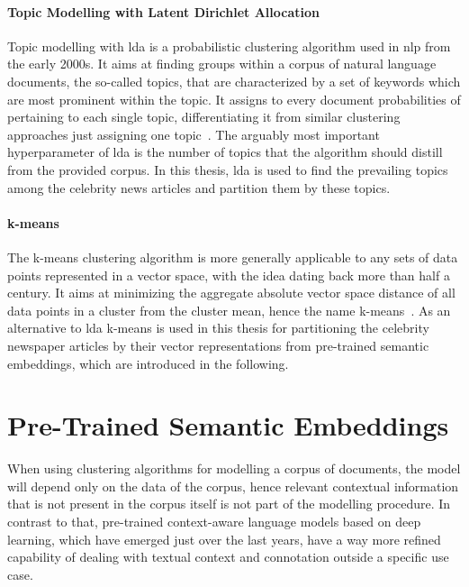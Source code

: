 \paragraph{Topic Modelling with Latent Dirichlet Allocation}\label{ch:lda}
Topic modelling with \gls{lda} is a probabilistic clustering algorithm used in \gls{nlp} from the early 2000s. It aims at finding groups within a corpus of natural language documents, the so-called topics, that are characterized by a set of keywords which are most prominent within the topic. It assigns to every document probabilities of pertaining to each single topic, differentiating it from similar clustering approaches just assigning one topic~\autocite{blei_latent_2003, blei_probabilistic_2012}. The arguably most important hyperparameter of \gls{lda} is the number of topics that the algorithm should distill from the provided corpus. In this thesis, \gls{lda} is used to find the prevailing topics among the celebrity news articles and partition them by these topics.

\paragraph{k-means}
The k-means clustering algorithm is more generally applicable to any sets of data points represented in a vector space, with the idea dating back more than half a century. It aims at minimizing the aggregate absolute vector space distance of all data points in a cluster from the cluster mean, hence the name k-means~\autocite{macqueen_methods_1967}. As an alternative to \gls{lda} k-means is used in this thesis for partitioning the celebrity newspaper articles by their vector representations from pre-trained semantic embeddings, which are introduced in the following.



\section{Pre-Trained Semantic Embeddings}\label{ch:pretrained_algorithms}
When using clustering algorithms for modelling a corpus of documents, the model will depend only on the data of the corpus, hence relevant contextual information that is not present in the corpus itself is not part of the modelling procedure. 
In contrast to that, pre-trained context-aware language models based on deep learning, which have emerged just over the last years, have a way more refined capability of dealing with textual context and connotation outside a specific use case.

